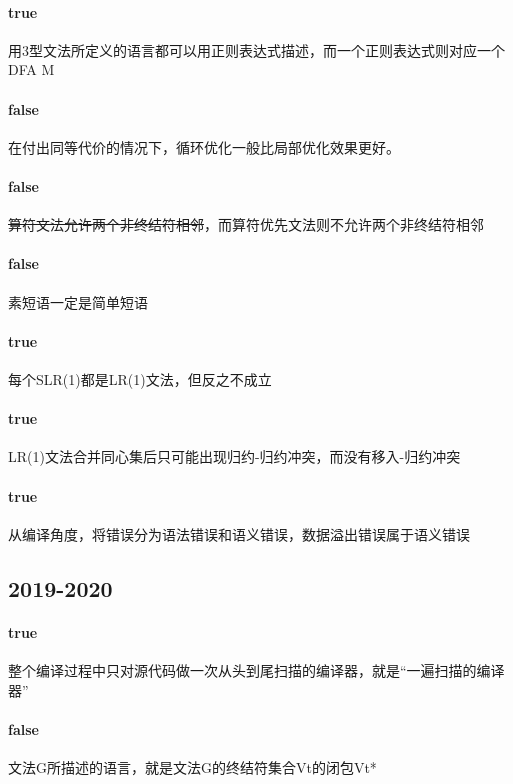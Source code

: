 \documentclass[UTF8]{ctexart} %
\begin{document}
\paragraph{true} 用3型文法所定义的语言都可以用正则表达式描述，而一个正则表达式则对应一个DFA M

\paragraph{false} 在付出同等代价的情况下，循环优化一般比局部优化效果更好。

\paragraph{false} \sout{算符文法允许两个非终结符相邻}，而算符优先文法则不允许两个非终结符相邻

\paragraph{false} 素短语一定是简单短语

\paragraph{true} 每个SLR(1)都是LR(1)文法，但反之不成立

\paragraph{true} LR(1)文法合并同心集后只可能出现归约-归约冲突，而没有移入-归约冲突

\paragraph{true} 从编译角度，将错误分为语法错误和语义错误，数据溢出错误属于语义错误

\subsection{2019-2020}

\paragraph{true} 整个编译过程中只对源代码做一次从头到尾扫描的编译器，就是“一遍扫描的编译器”

\paragraph{false} 文法G所描述的语言，就是文法G的终结符集合Vt的闭包Vt*
\end{document}
